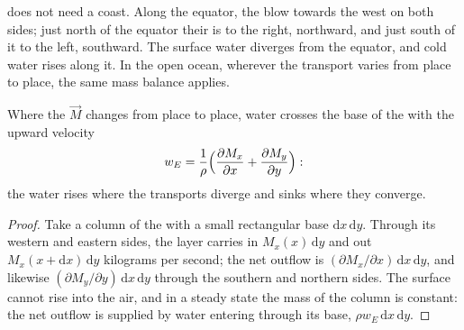  does not need a coast. Along the equator, the  blow towards the
west on both sides; just north of the equator their  is to the right,
northward, and just south of it to the left, southward. The surface water diverges
from the equator, and cold water rises along it. In the open ocean, wherever the
transport varies from place to place, the same mass balance applies.

\begin{proposition}\label{prop:b1:ocean-circulation:pumping}
Where the  $\vec M$ changes from place to place, water crosses the
base of the  with the upward velocity
\[
  w_E = \frac{1}{\rho}\Bigl(\frac{\partial M_x}{\partial x} + \frac{\partial M_y}{\partial y}\Bigr):
\]
the water rises where the transports diverge and sinks where they converge.
\end{proposition}

\begin{proof}
Take a column of the  with a small rectangular base $\mathrm dx\,\mathrm
dy$. Through its western and eastern sides, the layer carries in $M_x(x)\,\mathrm dy$
and out $M_x(x + \mathrm dx)\,\mathrm dy$ kilograms per second; the net outflow is
$(\partial M_x/\partial x)\,\mathrm dx\,\mathrm dy$, and likewise
$(\partial M_y/\partial y)\,\mathrm dx\,\mathrm dy$ through the southern and
northern sides. The surface cannot rise into the air, and in a steady state the mass
of the column is constant: the net outflow is supplied by water entering through
its base, $\rho w_E\,\mathrm dx\,\mathrm dy$.
\end{proof}

